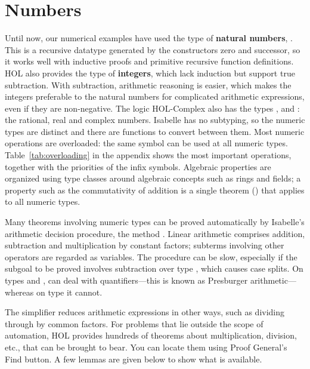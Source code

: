
\section{Numbers}
\label{sec:numbers}

%
Until now, our numerical examples have used the type of \textbf{natural
numbers},
.  This is a recursive datatype generated by the constructors
zero  and successor, so it works well with inductive proofs and primitive
recursive function definitions.  HOL also provides the type
 of \textbf{integers}, which lack induction but support true
subtraction.  With subtraction, arithmetic reasoning is easier, which makes
the integers preferable to the natural numbers for
complicated arithmetic expressions, even if they are non-negative.  The logic HOL-Complex also has the types
,  and : the rational, real and complex numbers.  Isabelle has no 
subtyping,  so the numeric
types are distinct and there are functions to convert between them.
Most numeric operations are overloaded: the same symbol can be
used at all numeric types. Table~\ref{tab:overloading} in the appendix
shows the most important operations, together with the priorities of the
infix symbols. Algebraic properties are organized using type classes
around algebraic concepts such as rings and fields;
a property such as the commutativity of addition is a single theorem 
() that applies to all numeric types.

%
Many theorems involving numeric types can be proved automatically by
Isabelle's arithmetic decision procedure, the method
.  Linear arithmetic comprises addition, subtraction
and multiplication by constant factors; subterms involving other operators
are regarded as variables.  The procedure can be slow, especially if the
subgoal to be proved involves subtraction over type , which 
causes case splits.  On types  and , 
can deal with quantifiers---this is known as Presburger arithmetic---whereas on type  it cannot.

The simplifier reduces arithmetic expressions in other
ways, such as dividing through by common factors.  For problems that lie
outside the scope of automation, HOL provides hundreds of
theorems about multiplication, division, etc., that can be brought to
bear.  You can locate them using Proof General's Find
button.  A few lemmas are given below to show what
is available.

